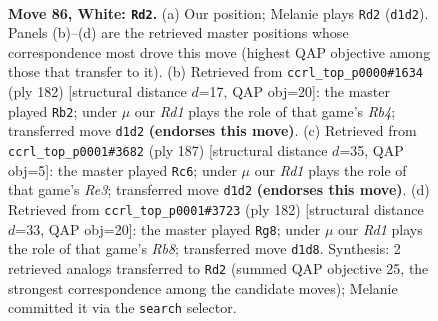 \documentclass[11pt]{article}
\begin{document}
\clearpage

\begin{figure}[p]\centering
\begin{subfigure}{0.46\textwidth}\centering
\resizebox{\linewidth}{!}{%
\newchessgame
\chessboard[
  setfen={6r1/8/p3k3/Ppp2p1p/2p2P1P/4PKP1/1P6/3R4 w - - 17 86},
  showmover=false,
  pgfstyle=straightmove, color=movearrow, markmove={d1-d2}
]}
\caption{}
\end{subfigure}\hfill
\begin{subfigure}{0.46\textwidth}\centering
\resizebox{\linewidth}{!}{%
\newchessgame
\chessboard[
  setfen={8/2p5/3p2pk/r2Pp1p1/1RP1P3/5PKP/8/8 w - - 1 92},
  showmover=false,
  pgfstyle=straightmove, color=movearrow, markmove={b4-b2}
]}
\caption{}
\end{subfigure}
\\[4pt]
\begin{subfigure}{0.46\textwidth}\centering
\resizebox{\linewidth}{!}{%
\newchessgame
\chessboard[
  setfen={8/6R1/1p2r1p1/p1kp1p1p/5P1P/PP1KP1P1/8/8 b - - 10 94},
  showmover=false,
  pgfstyle=straightmove, color=movearrow, markmove={e6-c6}
]}
\caption{}
\end{subfigure}\hfill
\begin{subfigure}{0.46\textwidth}\centering
\resizebox{\linewidth}{!}{%
\newchessgame
\chessboard[
  setfen={1R6/5p2/4p2k/4Pp1p/5P1P/6PK/5r2/8 w - - 67 92},
  showmover=false,
  pgfstyle=straightmove, color=movearrow, markmove={b8-g8}
]}
\caption{}
\end{subfigure}
\caption{\textbf{Move 86, White: \texttt{Rd2}.} (a) Our position; Melanie plays \texttt{Rd2} (\texttt{d1d2}). Panels (b)--(d) are the retrieved master positions whose correspondence most drove this move (highest QAP objective among those that transfer to it). (b) Retrieved from \texttt{ccrl\_top\_p0000\#1634} (ply 182) [structural distance $d$=17, QAP obj=20]: the master played \texttt{Rb2}; under $\mu$ our \emph{Rd1} plays the role of that game's \emph{Rb4}; transferred move \texttt{d1d2} \textbf{(endorses this move)}. (c) Retrieved from \texttt{ccrl\_top\_p0001\#3682} (ply 187) [structural distance $d$=35, QAP obj=5]: the master played \texttt{Rc6}; under $\mu$ our \emph{Rd1} plays the role of that game's \emph{Re3}; transferred move \texttt{d1d2} \textbf{(endorses this move)}. (d) Retrieved from \texttt{ccrl\_top\_p0001\#3723} (ply 182) [structural distance $d$=33, QAP obj=20]: the master played \texttt{Rg8}; under $\mu$ our \emph{Rd1} plays the role of that game's \emph{Rb8}; transferred move \texttt{d1d8}. Synthesis: 2 retrieved analogs transferred to \texttt{Rd2} (summed QAP objective 25, the strongest correspondence among the candidate moves); Melanie committed it via the \texttt{search} selector.}
\label{fig:thought-m170}
\end{figure}
\end{document}

